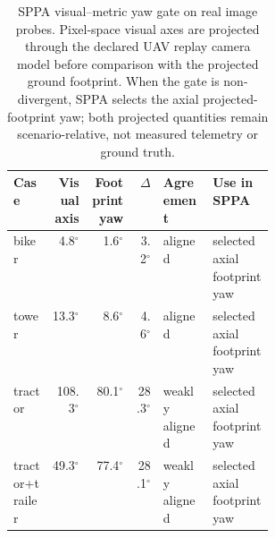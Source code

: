\begin{table}[H]
\centering
\footnotesize
\setlength{\tabcolsep}{3pt}
\renewcommand{\arraystretch}{1.08}
\caption{SPPA visual--metric yaw gate on real image probes. Pixel-space visual axes are projected through the declared UAV replay camera model before comparison with the projected ground footprint. When the gate is non-divergent, SPPA selects the axial projected-footprint yaw; both projected quantities remain scenario-relative, not measured telemetry or ground truth.}
\label{tab:sppa-visual-metric-yaw}
\begin{tabularx}{\linewidth}{@{}L{0.15\linewidth}r r r L{0.19\linewidth}Y@{}}
\toprule
Case & Visual axis & Footprint yaw & $\Delta$ & Agreement & Use in SPPA \\
\midrule
biker & 4.8$^\circ$ & 1.6$^\circ$ & 3.2$^\circ$ & aligned & selected axial footprint yaw \\
tower & 13.3$^\circ$ & 8.6$^\circ$ & 4.6$^\circ$ & aligned & selected axial footprint yaw \\
tractor & 108.3$^\circ$ & 80.1$^\circ$ & 28.3$^\circ$ & weakly aligned & selected axial footprint yaw \\
tractor+trailer & 49.3$^\circ$ & 77.4$^\circ$ & 28.1$^\circ$ & weakly aligned & selected axial footprint yaw \\
\bottomrule
\end{tabularx}
\end{table}
